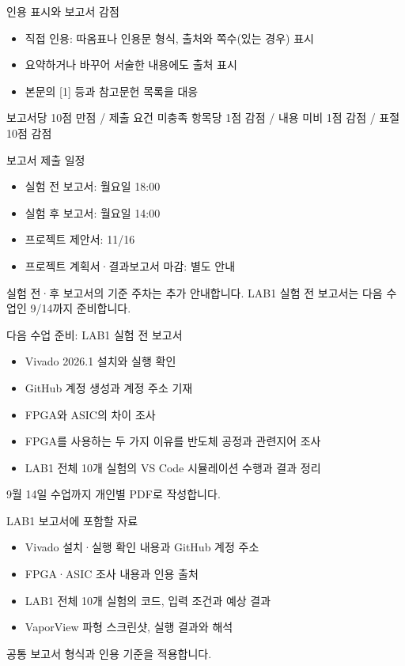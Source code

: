 \documentclass[aspectratio=169,11pt,t]{beamer}
\begin{document}
\begin{frame}{인용 표시와 보고서 감점}
\begin{itemize}
\item 직접 인용: 따옴표나 인용문 형식, 출처와 쪽수(있는 경우) 표시
\item 요약하거나 바꾸어 서술한 내용에도 출처 표시
\item 본문의 [1] 등과 참고문헌 목록을 대응
\end{itemize}
\vspace{0.35cm}
보고서당 10점 만점 / 제출 요건 미충족 항목당 1점 감점 / 내용 미비 1점 감점 / 표절 10점 감점
\end{frame}

\begin{frame}{보고서 제출 일정}
\begin{itemize}
\item 실험 전 보고서: 월요일 18:00
\item 실험 후 보고서: 월요일 14:00
\item 프로젝트 제안서: 11/16
\item 프로젝트 계획서·결과보고서 마감: 별도 안내
\end{itemize}
\vspace{0.35cm}
실험 전·후 보고서의 기준 주차는 추가 안내합니다. LAB1 실험 전 보고서는 다음 수업인 9/14까지 준비합니다.
\end{frame}

\begin{frame}{다음 수업 준비: LAB1 실험 전 보고서}
\begin{itemize}
\item Vivado 2026.1 설치와 실행 확인
\item GitHub 계정 생성과 계정 주소 기재
\item FPGA와 ASIC의 차이 조사
\item FPGA를 사용하는 두 가지 이유를 반도체 공정과 관련지어 조사
\item LAB1 전체 10개 실험의 VS Code 시뮬레이션 수행과 결과 정리
\end{itemize}
\vspace{0.35cm}
9월 14일 수업까지 개인별 PDF로 작성합니다.
\end{frame}

\begin{frame}{LAB1 보고서에 포함할 자료}
\begin{itemize}
\item Vivado 설치·실행 확인 내용과 GitHub 계정 주소
\item FPGA·ASIC 조사 내용과 인용 출처
\item LAB1 전체 10개 실험의 코드, 입력 조건과 예상 결과
\item VaporView 파형 스크린샷, 실행 결과와 해석
\end{itemize}
\vspace{0.35cm}
공통 보고서 형식과 인용 기준을 적용합니다.
\end{frame}
\end{document}
